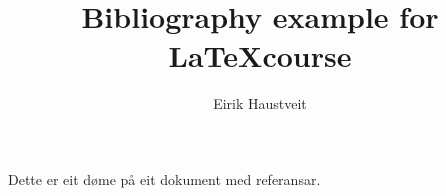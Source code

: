 \documentclass[10pt,a4paper]{article}
\title{Bibliography example for \LaTeX course}
\author{Eirik Haustveit}
\begin{document}
	
	\maketitle
	
	
	Dette er eit døme på eit dokument med referansar.
	
	
\end{document}
